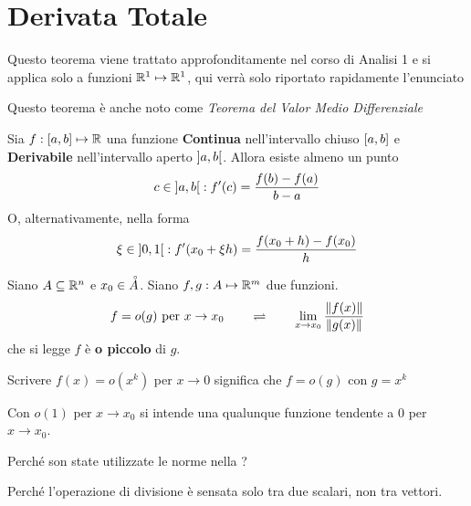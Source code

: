\section{Derivata Totale}
\begin{theorem}[di Lagrange]\leavevmode\vspace*{-\baselineskip}
	\label{teo:lagrange}
	\begin{note}
		Questo teorema viene trattato approfonditamente nel corso di Analisi 1 e si applica solo a funzioni $\mathbb{R}^1 \mapsto \mathbb{R}^1$, qui verrà solo riportato rapidamente l'enunciato
	\end{note}
	\begin{note}
		Questo teorema è anche noto come \textit{Teorema del Valor Medio Differenziale}
	\end{note}
	Sia $f: \left[a,b\right] \mapsto \mathbb{R}$ una funzione \textbf{Continua} nell'intervallo chiuso $\left[a,b\right]$ e \textbf{Derivabile} nell'intervallo aperto $\left]a,b\right[$. Allora esiste almeno un punto
	\[c \in \left]a,b\right[ : f'(c) = \frac{f(b)-f(a)}{b - a}\]
	O, alternativamente, nella forma
	\[\xi \in \left]0,1\right[ : f'(x_0 + \xi h) = \frac{f(x_0 + h)-f(x_0)}{h}\]
\end{theorem}
\begin{definition}[o piccolo]
	\label{def:o_piccolo}
	Siano $A \subseteq \mathbb{R}^n$ e $x_0 \in \accentset{\circ}{A}$. Siano $f,g: A \mapsto \mathbb{R}^m$ due funzioni.
	\[f=o(g) \text{ per } x \to x_0 \qquad \rightleftharpoons \qquad \lim\limits_{x \to x_0} \frac{\left\|f(x)\right\|}{\left\|g(x)\right\|}\]
	che si legge $f$ è \textbf{o piccolo} di $g$.
	\begin{note}
		Scrivere $f(x) = o(x^k)$ per $x \to 0$ significa che $f = o(g)$ con $g = x^k$
	\end{note}
	\begin{note}
		Con $o(1)$ per $x \to x_0$ si intende una qualunque funzione tendente a $0$ per $x \to x_0$.
	\end{note}
\end{definition}
\begin{exercise}
	Perché son state utilizzate le norme nella ?
	\begin{solution}
		Perché l'operazione di divisione è sensata solo tra due scalari, non tra vettori.
	\end{solution}
\end{exercise}
